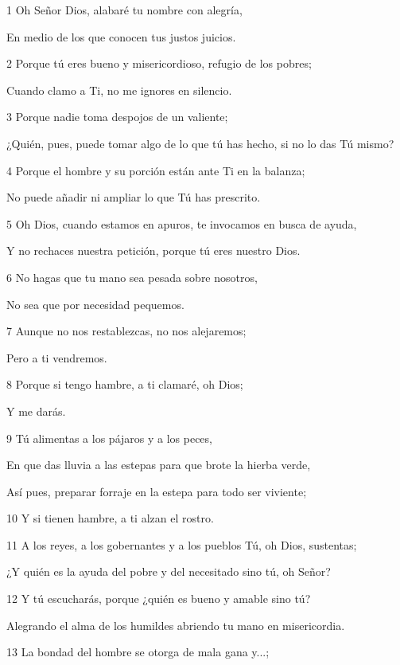 \par 1 Oh Señor Dios, alabaré tu nombre con alegría,
\par     En medio de los que conocen tus justos juicios.
\par 2 Porque tú eres bueno y misericordioso, refugio de los pobres;
\par     Cuando clamo a Ti, no me ignores en silencio.
\par 3 Porque nadie toma despojos de un valiente;
\par     ¿Quién, pues, puede tomar algo de lo que tú has hecho, si no lo das Tú mismo?
\par 4 Porque el hombre y su porción están ante Ti en la balanza;
\par     No puede añadir ni ampliar lo que Tú has prescrito.
\par   
\par 5 Oh Dios, cuando estamos en apuros, te invocamos en busca de ayuda,
\par     Y no rechaces nuestra petición, porque tú eres nuestro Dios.
\par 6 No hagas que tu mano sea pesada sobre nosotros,
\par     No sea que por necesidad pequemos.
\par 7 Aunque no nos restablezcas, no nos alejaremos;
\par     Pero a ti vendremos.
\par 8 Porque si tengo hambre, a ti clamaré, oh Dios;
\par     Y me darás.
\par   
\par 9 Tú alimentas a los pájaros y a los peces,
\par     En que das lluvia a las estepas para que brote la hierba verde,
\par     Así pues, preparar forraje en la estepa para todo ser viviente;
\par 10 Y si tienen hambre, a ti alzan el rostro.
\par 11 A los reyes, a los gobernantes y a los pueblos Tú, oh Dios, sustentas;
\par     ¿Y quién es la ayuda del pobre y del necesitado sino tú, oh Señor?
\par 12 Y tú escucharás, porque ¿quién es bueno y amable sino tú?
\par     Alegrando el alma de los humildes abriendo tu mano en misericordia.
\par   
\par 13 La bondad del hombre se otorga de mala gana y...;
